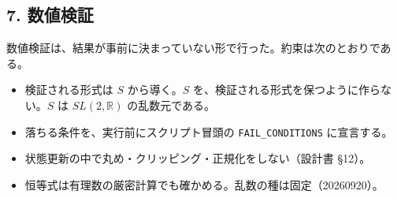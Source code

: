 \documentclass[
  a4paper,
]{ltjsarticle}
\providecommand{\tightlist}{%
  \setlength{\itemsep}{0pt}\setlength{\parskip}{0pt}}
\begin{document}
\subsection{7. 数値検証}\label{ux6570ux5024ux691cux8a3c}

数値検証は、結果が事前に決まっていない形で行った。約束は次のとおりである。

\begin{itemize}
\tightlist
\item
  検証される形式は \(S\) から導く。\(S\)
  を、検証される形式を保つように作らない。\(S\) は \(SL(2,\mathbb R)\)
  の乱数元である。
\item
  落ちる条件を、実行前にスクリプト冒頭の \texttt{FAIL\_CONDITIONS}
  に宣言する。
\item
  状態更新の中で丸め・クリッピング・正規化をしない（設計書 §12）。
\item
  恒等式は有理数の厳密計算でも確かめる。乱数の種は固定（20260920）。
\end{itemize}
\end{document}
